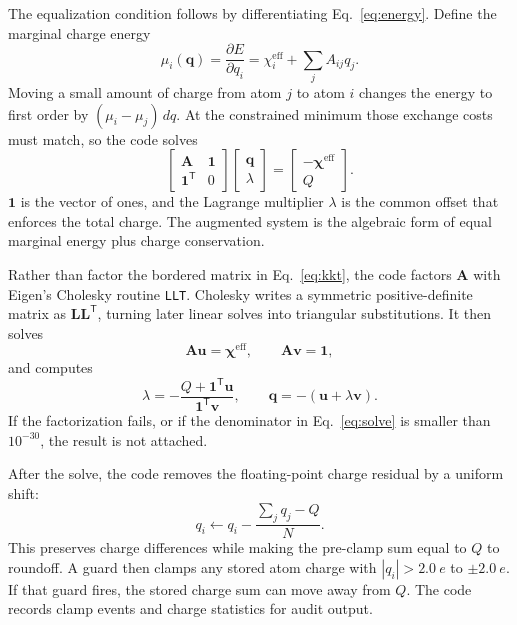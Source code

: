 \documentclass[11pt]{article}
\begin{document}
The equalization condition follows by differentiating Eq.~\eqref{eq:energy}.
Define the marginal charge energy
\begin{equation}
  \mu_i(\bm q)=\frac{\partial E}{\partial q_i}
  =
  \chi^{\mathrm{eff}}_i+\sum_j A_{ij}q_j .
  \label{eq:mu}
\end{equation}
Moving a small amount of charge from atom \(j\) to atom \(i\) changes the energy
to first order by \((\mu_i-\mu_j)\,dq\). At the constrained minimum those
exchange costs must match, so the code solves
\begin{equation}
  \begin{bmatrix}
    \bm A & \bm 1\\
    \bm 1^{\mathsf T} & 0
  \end{bmatrix}
  \begin{bmatrix}
    \bm q\\ \lambda
  \end{bmatrix}
  =
  \begin{bmatrix}
    -\bm\chi^{\mathrm{eff}}\\ Q
  \end{bmatrix}.
  \label{eq:kkt}
\end{equation}
\(\bm 1\) is the vector of ones, and the Lagrange multiplier \(\lambda\) is the
common offset that enforces the total charge. The augmented system is the
algebraic form of equal marginal energy plus charge conservation.

Rather than factor the bordered matrix in Eq.~\eqref{eq:kkt}, the code factors
\(\bm A\) with Eigen's Cholesky routine \texttt{LLT}. Cholesky writes a
symmetric positive-definite matrix as \(\bm L\bm L^{\mathsf T}\), turning later
linear solves into triangular substitutions. It then solves
\begin{equation}
  \bm A\bm u=\bm\chi^{\mathrm{eff}},
  \qquad
  \bm A\bm v=\bm 1,
  \label{eq:uv}
\end{equation}
and computes
\begin{equation}
  \lambda =
  -\frac{Q+\bm 1^{\mathsf T}\bm u}{\bm 1^{\mathsf T}\bm v},
  \qquad
  \bm q=-(\bm u+\lambda\bm v).
  \label{eq:solve}
\end{equation}
If the factorization fails, or if the denominator in Eq.~\eqref{eq:solve} is
smaller than \(10^{-30}\), the result is not attached.

After the solve, the code removes the floating-point charge residual by a
uniform shift:
\begin{equation}
  q_i \leftarrow q_i -
  \frac{\sum_j q_j-Q}{N}.
  \label{eq:residual}
\end{equation}
This preserves charge differences while making the pre-clamp sum equal to
\(Q\) to roundoff. A guard then clamps any stored atom charge with
\(|q_i|>\SI{2.0}{\elementarycharge}\) to
\(\pm\SI{2.0}{\elementarycharge}\). If that guard fires, the stored charge sum
can move away from \(Q\). The code records clamp events and charge statistics
for audit output.
\end{document}
